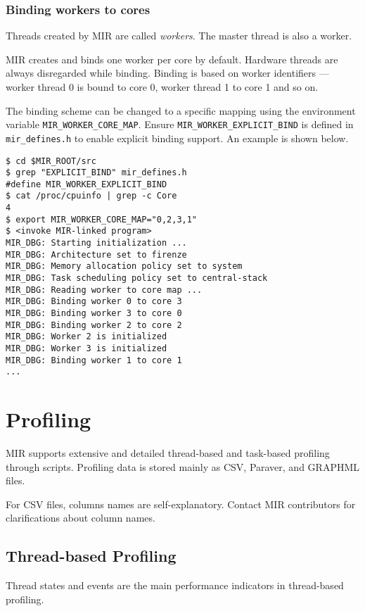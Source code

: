 \documentclass[11pt,a4paper]{article}
\begin{document}
\subsubsection{Binding workers to cores}\label{binding-workers-to-cores}
Threads created by MIR are called \textit{workers}. The master thread is also a worker.

MIR creates and binds one worker per core by default. Hardware threads are always disregarded while binding. Binding is based on worker identifiers --- worker thread 0 is bound to core 0, worker thread 1 to core 1 and so on.

The binding scheme can be changed to a specific mapping using the environment variable \texttt{MIR\_WORKER\_CORE\_MAP}. Ensure \texttt{MIR\_WORKER\_EXPLICIT\_BIND} is defined in \texttt{mir\_defines.h} to enable explicit binding support. An example is shown below.

\begin{lstlisting}[style=MyInputStyle]
$ cd $MIR_ROOT/src
$ grep "EXPLICIT_BIND" mir_defines.h
#define MIR_WORKER_EXPLICIT_BIND
$ cat /proc/cpuinfo | grep -c Core
4
$ export MIR_WORKER_CORE_MAP="0,2,3,1"
$ <invoke MIR-linked program>
MIR_DBG: Starting initialization ...
MIR_DBG: Architecture set to firenze
MIR_DBG: Memory allocation policy set to system
MIR_DBG: Task scheduling policy set to central-stack
MIR_DBG: Reading worker to core map ...
MIR_DBG: Binding worker 0 to core 3
MIR_DBG: Binding worker 3 to core 0
MIR_DBG: Binding worker 2 to core 2
MIR_DBG: Worker 2 is initialized
MIR_DBG: Worker 3 is initialized
MIR_DBG: Binding worker 1 to core 1
...
\end{lstlisting}

\section{Profiling}\label{profiling}

MIR supports extensive and detailed thread-based and task-based profiling through scripts. Profiling data is stored mainly as CSV, Paraver, and GRAPHML files.

For CSV files, columns names are self-explanatory. Contact MIR contributors for clarifications about column names.

\subsection{Thread-based Profiling}\label{thread-based-profiling}

Thread states and events are the main performance indicators in thread-based profiling.
\end{document}
